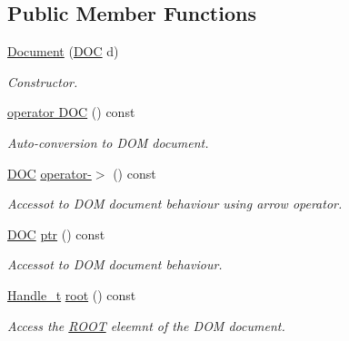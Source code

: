 \subsection*{Public Member Functions}
\begin{DoxyCompactItemize}
\item 
\hyperlink{class_d_d4hep_1_1_x_m_l_1_1_document_a3f4274cfb546e8b61f6a1de9e6f43a4e}{Document} (\hyperlink{class_d_d4hep_1_1_x_m_l_1_1_document_a685ff83de83e9b7b37e79ad846fc2387}{DOC} d)
\begin{DoxyCompactList}\small\item\em Constructor. \item\end{DoxyCompactList}\item 
\hyperlink{class_d_d4hep_1_1_x_m_l_1_1_document_a1fcde4cc17c1e99e300164c390db6123}{operator DOC} () const 
\begin{DoxyCompactList}\small\item\em Auto-\/conversion to DOM document. \item\end{DoxyCompactList}\item 
\hyperlink{class_d_d4hep_1_1_x_m_l_1_1_document_a685ff83de83e9b7b37e79ad846fc2387}{DOC} \hyperlink{class_d_d4hep_1_1_x_m_l_1_1_document_a17dd174a1b4e575582f55264f81e30d0}{operator-\/$>$} () const 
\begin{DoxyCompactList}\small\item\em Accessot to DOM document behaviour using arrow operator. \item\end{DoxyCompactList}\item 
\hyperlink{class_d_d4hep_1_1_x_m_l_1_1_document_a685ff83de83e9b7b37e79ad846fc2387}{DOC} \hyperlink{class_d_d4hep_1_1_x_m_l_1_1_document_a6b98d5a28e0e8b7310829a800ac74157}{ptr} () const 
\begin{DoxyCompactList}\small\item\em Accessot to DOM document behaviour. \item\end{DoxyCompactList}\item 
\hyperlink{class_d_d4hep_1_1_x_m_l_1_1_handle__t}{Handle\_\-t} \hyperlink{class_d_d4hep_1_1_x_m_l_1_1_document_a47d622c2e7c92089b4b7feb230154be4}{root} () const 
\begin{DoxyCompactList}\small\item\em Access the \hyperlink{namespace_r_o_o_t}{ROOT} eleemnt of the DOM document. \item\end{DoxyCompactList}\item 

\end{DoxyCompactItemize}
